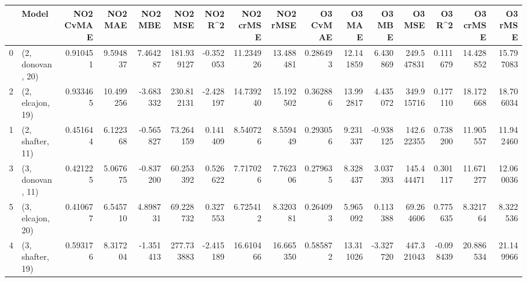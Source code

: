 \begin{tabular}{llrrrrrrrrrrrrrr}
\toprule
{} &             Model &  NO2 CvMAE &    NO2 MAE &   NO2 MBE &     NO2 MSE &   NO2 R\textasciicircum2 &  NO2 crMSE &   NO2 rMSE &  O3 CvMAE &     O3 MAE &    O3 MBE &      O3 MSE &    O3 R\textasciicircum2 &   O3 crMSE &    O3 rMSE \\
\midrule
0 &  (2, donovan, 20) &   0.910451 &   9.594837 &  7.464287 &  181.939127 & -0.352053 &  11.234926 &  13.488481 &  0.286493 &  12.141859 &  6.430869 &  249.547831 &  0.111679 &  14.428852 &  15.797083 \\
2 &  (2, elcajon, 19) &   0.933465 &  10.499256 & -3.683332 &  230.812131 & -2.428197 &  14.739240 &  15.192502 &  0.362886 &  13.992817 &  4.435072 &  349.915716 &  0.177110 &  18.172668 &  18.706034 \\
1 &  (2, shafter, 11) &   0.451644 &   6.122368 & -0.565827 &   73.264159 &  0.141409 &   8.540726 &   8.559449 &  0.293056 &   9.231337 & -0.938125 &  142.622355 &  0.738200 &  11.905557 &  11.942460 \\
3 &  (3, donovan, 11) &   0.421225 &   5.067675 & -0.837200 &   60.253392 &  0.526622 &   7.717026 &   7.762306 &  0.279635 &   8.328437 &  3.037393 &  145.444471 &  0.301117 &  11.671277 &  12.060036 \\
5 &  (3, elcajon, 20) &   0.410677 &   6.545710 &  4.898731 &   69.228732 &  0.327553 &   6.725412 &   8.320381 &  0.264093 &   5.965092 &  0.113388 &   69.264606 &  0.775635 &   8.321764 &   8.322536 \\
4 &  (3, shafter, 19) &   0.593176 &   8.317204 & -1.351413 &  277.733883 & -2.415189 &  16.610466 &  16.665350 &  0.585872 &  13.311026 & -3.327720 &  447.321043 & -0.098439 &  20.886534 &  21.149966 \\
\bottomrule
\end{tabular}
